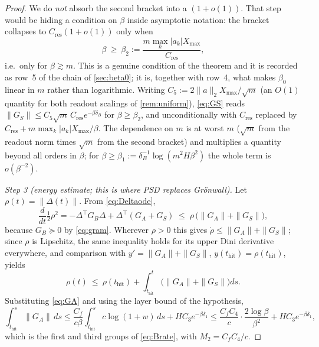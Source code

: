 \documentclass[11pt]{article}
\theoremstyle{definition}
\theoremstyle{remark}
\newcommand{\thit}{t_{\mathrm{hit}}}
\begin{document}
\begin{proof}
We do \emph{not} absorb the second bracket into a $(1+o(1))$. That step would be
hiding a condition on $\beta$ inside asymptotic notation: the bracket collapses
to $C_{\mathrm{res}}(1+o(1))$ only when
\begin{equation}\label{eq:beta2}
\beta\ \ge\ \beta_2:=\frac{m\max_k|a_k|X_{\max}}{C_{\mathrm{res}}},
\end{equation}
i.e.\ only for $\beta\gtrsim m$. This is a genuine condition of the theorem and it
is recorded as row~5 of the chain of \cref{sec:beta0}; it is, together with row~4,
what makes $\beta_0$ linear in $m$ rather than logarithmic. Writing
$C_5:=2\|a\|_2X_{\max}/\sqrt m$ (an $O(1)$ quantity for both readout scalings of
\cref{rem:uniform}), \eqref{eq:GS} reads
$\|G_S\|\le C_5\sqrt m\,C_{\mathrm{res}}e^{-\beta\delta_B}$ for
$\beta\ge\beta_2$, and unconditionally with $C_{\mathrm{res}}$ replaced by
$C_{\mathrm{res}}+m\max_k|a_k|X_{\max}/\beta$. The dependence on $m$ is at worst
$m$ ($\sqrt m$ from the readout norm times $\sqrt m$ from the second bracket) and
multiplies a quantity beyond all orders in $\beta$; for
$\beta\ge\beta_1:=\delta_B^{-1}\log(m^2 H\beta^2)$ the whole term is
$o(\beta^{-2})$.

\emph{Step 3 (energy estimate; this is where PSD replaces Gr\"onwall).}
Let $\rho(t)=\|\Delta(t)\|$. From \eqref{eq:Deltaode},
\[
\frac{d}{dt}\tfrac12\rho^2
=-\Delta^{\!\top}G_B\Delta+\Delta^{\!\top}(G_A+G_S)
\;\le\;\rho\,\bigl(\|G_A\|+\|G_S\|\bigr),
\]
because $G_B\succeq0$ by \eqref{eq:gram}. Wherever $\rho>0$ this gives
$\dot\rho\le\|G_A\|+\|G_S\|$; since $\rho$ is Lipschitz, the same inequality
holds for its upper Dini derivative everywhere, and comparison with
$y'=\|G_A\|+\|G_S\|$, $y(\thit)=\rho(\thit)$, yields
\begin{equation}\label{eq:psd}
\rho(t)\ \le\ \rho(\thit)+\int_{\thit}^{t}\bigl(\|G_A\|+\|G_S\|\bigr)ds .
\end{equation}
Substituting \eqref{eq:GA} and using the layer bound of the hypothesis,
\[
\int_{\thit}^{s}\|G_A\|\,ds
\le\frac{C_f}{c\beta}\int_{\thit}^{s}c\log(1+w)\,ds+HC_3e^{-\beta\delta_1}
\le\frac{C_fC_4}{c}\cdot\frac{2\log\beta}{\beta^{2}}+HC_3e^{-\beta\delta_1},
\]
which is the first and third groups of \eqref{eq:Brate}, with
$M_2=C_fC_4/c$.


\end{proof}
\end{document}
